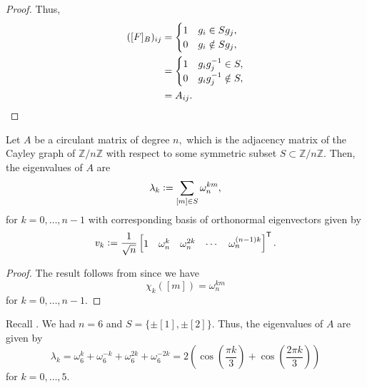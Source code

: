 \documentclass[12pt]{article}	%
\begin{document}
\begin{proof}
    Thus, 
    \begin{align*} 
        ([F]_B)_{ij} &= \begin{cases}
            1 & g_i \in Sg_j,\\
            0 & g_i \notin Sg_j,
        \end{cases}\\
        &= \begin{cases}
            1 & g_ig_j^{-1} \in S,\\
            0 & g_ig_j^{-1} \notin S,
        \end{cases}\\
        &= A_{ij}. \qedhere
    \end{align*}
\end{proof}

\begin{cor}
    Let $A$ be a circulant matrix of degree $n,$ which is the adjacency matrix of the Cayley graph of $\mathbb{Z}/n\mathbb{Z}$ with respect to some symmetric subset $S \subset \mathbb{Z}/n\mathbb{Z}.$ Then, the eigenvalues of $A$ are
    \begin{equation*} 
        \lambda_k \vcentcolon= \sum_{[m] \in S} \omega_n^{km},
    \end{equation*}
    for $k = 0, \ldots, n - 1$ with corresponding basis of orthonormal eigenvectors given by
    \begin{equation*} 
        v_k \vcentcolon= \frac{1}{\sqrt{n}}\begin{bmatrix}
            1 & \omega_n^{k} & \omega_n^{2k} & \cdots & \omega_n^{(n - 1)k}
        \end{bmatrix}^\mathsf{T}.
    \end{equation*}
\end{cor}
\begin{proof} 
    The result follows from  since we have
    \begin{equation*} 
        \chi_k([m]) = \omega_n^{km}
    \end{equation*}
    for $k = 0, \ldots, n - 1.$ 
\end{proof}

\begin{ex}
    Recall . We had $n = 6$ and $S = \{\pm [1], \pm [2]\}.$ Thus, the eigenvalues of $A$ are given by
    \begin{equation*} 
        \lambda_k = \omega_6^k + \omega_6^{-k} + \omega_6^{2k} + \omega_6^{-2k} = 2\left(\cos\left(\frac{\pi k}{3}\right) + \cos\left(\frac{2\pi k}{3}\right)\right)
    \end{equation*}
    for $k = 0, \ldots, 5.$
\end{ex}
\end{document}
